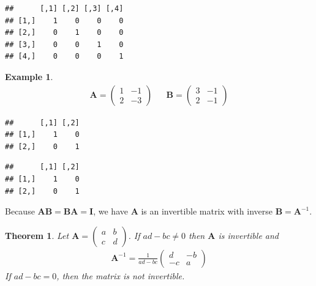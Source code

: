 \documentclass[
]{book}
\newenvironment{Shaded}{\begin{snugshade}}{\end{snugshade}}
\newcommand{\CommentTok}[1]{\textcolor[rgb]{0.56,0.35,0.01}{\textit{#1}}}
\newcommand{\NormalTok}[1]{#1}
\newcommand{\OperatorTok}[1]{\textcolor[rgb]{0.81,0.36,0.00}{\textbf{#1}}}
\newcommand{\StringTok}[1]{\textcolor[rgb]{0.31,0.60,0.02}{#1}}
\newtheorem{theorem}{Theorem}[chapter]
\theoremstyle{definition}
\theoremstyle{definition}
\newtheorem{example}{Example}[chapter]
\theoremstyle{definition}
\theoremstyle{definition}
\theoremstyle{remark}
\begin{document}
\begin{verbatim}
##      [,1] [,2] [,3] [,4]
## [1,]    1    0    0    0
## [2,]    0    1    0    0
## [3,]    0    0    1    0
## [4,]    0    0    0    1
\end{verbatim}

\begin{example}
\[
\begin{aligned}
\mathbf{A} = \begin{pmatrix} 1 & -1 \\ 2 & -3 \end{pmatrix} && \mathbf{B} = \begin{pmatrix} 3 & -1 \\ 2 & -1 \end{pmatrix}
\end{aligned}
\]

\begin{Shaded}
\end{Shaded}

\begin{verbatim}
##      [,1] [,2]
## [1,]    1    0
## [2,]    0    1
\end{verbatim}

\begin{Shaded}
\end{Shaded}

\begin{verbatim}
##      [,1] [,2]
## [1,]    1    0
## [2,]    0    1
\end{verbatim}

Because \(\mathbf{A} \mathbf{B} = \mathbf{B} \mathbf{A} = \mathbf{I}\), we have \(\mathbf{A}\) is an invertible matrix with inverse \(\mathbf{B} = \mathbf{A}^{-1}\).
\end{example}

\begin{theorem}
Let \(\mathbf{A} = \begin{pmatrix} a & b \\ c & d \end{pmatrix}\). If \(ad - bc \neq 0\) then \(\mathbf{A}\) is invertible and
\[
\begin{aligned}
\mathbf{A}^{-1} = \frac{1}{ad - bc} \begin{pmatrix} d & -b \\ -c & a \end{pmatrix}
\end{aligned}
\]
If \(ad - bc = 0\), then the matrix is not invertible.
\end{theorem}
\end{document}
